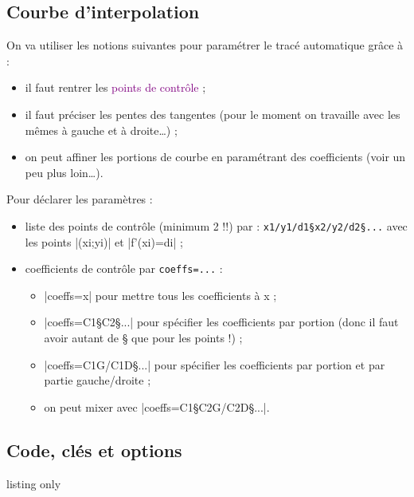 \subsection{Courbe d'interpolation}

\begin{noteblock}
On va utiliser les notions suivantes pour paramétrer le tracé \og automatique \fg{} grâce à   :
%
\begin{itemize}
	\item il faut rentrer les \textcolor{purple}{\textsf{points de contrôle}} ;
	\item il faut préciser les \textcolor{CouleurVertForet}{\textsf{pentes des tangentes}} (pour le moment on travaille avec les mêmes à gauche et à droite\ldots) ;
	\item on peut \og affiner \fg{} les portions de courbe en paramétrant des \textcolor{BleuCadet}{\textsf{coefficients}} (voir un peu plus loin\ldots).
\end{itemize}

\medskip

Pour déclarer les paramètres :
%
\begin{itemize}
	\item liste des points de contrôle (minimum 2 !!) par : \verb|x1/y1/d1§x2/y2/d2§...| avec les points \pverb|(xi;yi)| et \vverb|f'(xi)=di| ;
	\item coefficients de contrôle par \verb|coeffs=...| :
	\begin{itemize}
		\item \averb|coeffs=x| pour mettre tous les coefficients à x ;
		\item \averb|coeffs=C1§C2§...| pour spécifier les coefficients par portion (donc il faut avoir autant de § que pour les points !) ;
		\item \averb|coeffs=C1G/C1D§...| pour spécifier les coefficients par portion et par partie gauche/droite ;
		\item on peut mixer avec \averb|coeffs=C1§C2G/C2D§...|.
	\end{itemize}
\end{itemize}
\vspace*{-\baselineskip}\leavevmode
\end{noteblock}

\subsection{Code, clés et options}

\begin{PresCodeTexPL}{listing only}
\end{PresCodeTexPL}

